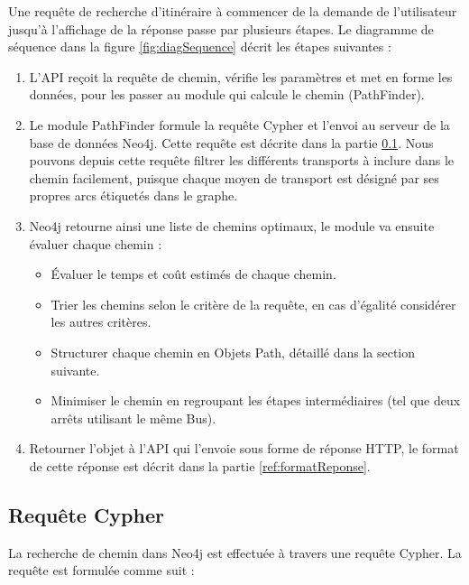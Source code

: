 Une requête de recherche d'itinéraire à commencer de la demande de l'utilisateur jusqu'à l'affichage de la réponse passe par plusieurs étapes. Le diagramme de séquence dans la figure \ref{fig:diagSequence} décrit les étapes suivantes :
\begin{enumerate}
	\item L'API reçoit la requête de chemin, vérifie les paramètres et met en forme les données, pour les passer au module qui calcule le chemin (PathFinder).
	\item Le module PathFinder formule la requête Cypher et l'envoi au serveur de la base de données Neo4j. Cette requête est décrite dans la partie \ref{section:cypher}.
	      Nous pouvons depuis cette requête filtrer les différents transports à inclure dans le chemin facilement, puisque chaque moyen de transport est désigné par ses propres arcs étiquetés dans le graphe.
	\item Neo4j retourne ainsi une liste de chemins optimaux, le module va ensuite évaluer chaque chemin :
	      \begin{itemize}
	      	\item Évaluer le temps et coût estimés de chaque chemin.
	      	\item Trier les chemins selon le critère de la requête, en cas d'égalité considérer les autres critères.
	      	\item Structurer chaque chemin en Objets Path, détaillé dans la section suivante.
	      	\item Minimiser le chemin en regroupant les étapes intermédiaires (tel que deux arrêts utilisant le même Bus).
	      \end{itemize}
	\item Retourner l'objet à l'API qui l'envoie sous forme de réponse HTTP, le format de cette réponse est décrit dans la partie \ref{ref:formatReponse}.
\end{enumerate}
\label{SectionPathFinding}
	
\subsection{Requête Cypher}
\label{section:cypher}

La recherche de chemin dans Neo4j est effectuée à travers une requête Cypher. La requête est formulée comme suit :

